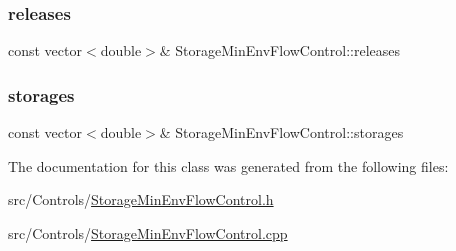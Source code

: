\subsubsection{\texorpdfstring{releases}{releases}}
{\footnotesize\ttfamily const vector$<$double$>$\& Storage\+Min\+Env\+Flow\+Control\+::releases}

\mbox{\label{classStorageMinEnvFlowControl_af68170e5f561f1bfc2062f9e6ec8dd6d_af68170e5f561f1bfc2062f9e6ec8dd6d}} 
\subsubsection{\texorpdfstring{storages}{storages}}
{\footnotesize\ttfamily const vector$<$double$>$\& Storage\+Min\+Env\+Flow\+Control\+::storages}



The documentation for this class was generated from the following files\+:\begin{DoxyCompactItemize}
\item 
src/\+Controls/\mbox{\hyperlink{StorageMinEnvFlowControl_8h}{Storage\+Min\+Env\+Flow\+Control.\+h}}\item 
src/\+Controls/\mbox{\hyperlink{StorageMinEnvFlowControl_8cpp}{Storage\+Min\+Env\+Flow\+Control.\+cpp}}\end{DoxyCompactItemize}
